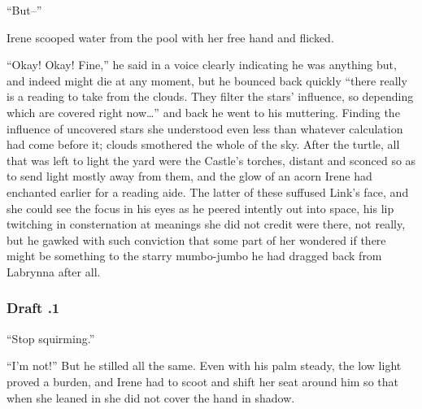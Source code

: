 \documentclass[../FGP.tex]{subfiles}
\begin{document}
\begin{fragment}
``But--'' 

Irene scooped water from the pool with her free hand and flicked. 

``Okay! Okay! Fine,'' he said in a voice clearly indicating he was anything but, and indeed might die at any moment, but he bounced back quickly ``there really is a reading to take from the clouds. They filter the stars' influence, so depending which are covered right now\ldots'' and back he went to his muttering. Finding the influence of uncovered stars she understood even less than whatever calculation had come before it; clouds smothered the whole of the sky. After the turtle, all that was left to light the yard were the Castle's torches, distant and sconced so as to send light mostly away from them, and the glow of an acorn Irene had enchanted earlier for a reading aide. The latter of these suffused Link's face, and she could see the focus in his eyes as he peered intently out into space, his lip twitching in consternation at meanings she did not credit were there, not really, but he gawked with such conviction that some part of her wondered if there might be something to the starry mumbo-jumbo he had dragged back from Labrynna after all.  
\subsubsection{Draft \thefragment.1 }
 

 ``Stop squirming.''

 ``I'm not!'' But he stilled all the same. Even with his palm steady, the low light proved a burden, and Irene had to scoot and shift her seat around him so that when she leaned in she did not cover the hand in shadow.
 

\end{fragment}
\end{document}
